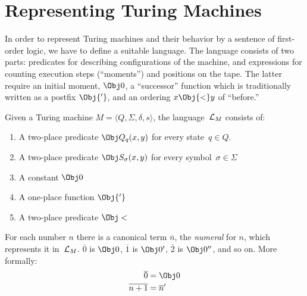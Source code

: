 \documentclass[open-logic-section]{subfiles}
\begin{document}
\section{Representing Turing Machines}

\begin{wordy}
In order to represent Turing machines and their behavior by a sentence
of first-order logic, we have to define a suitable language. The
language consists of two parts: predicates for describing
configurations of the machine, and expressions for counting execution
steps (``moments'') and positions on the tape. The latter require an
initial moment, $\Obj 0$, a ``successor'' function which is
traditionally written as a postfix $\Obj{'}$, and an ordering $x
\Obj{<} y$ of ``before.''
\end{wordy}

\begin{defn}
Given a Turing machine $M = \langle Q, \Sigma, \delta, s\rangle$, the
language~$\mathcal L_M$ consists of:
\begin{enumerate}
\item A two-place predicate $\Obj Q_q(x, y)$ for every state~$q \in Q$.
\item A two-place predicate $\Obj S_\sigma(x, y)$ for every
  symbol~$\sigma\in \Sigma$
\item A constant $\Obj 0$
\item A one-place function $\Obj{'}$
\item A two-place predicate $\Obj <$
\end{enumerate}
\end{defn}

For each number $n$ there is a canonical term $\overline n$, the
\emph{numeral} for $n$, which represents it in~$\mathcal L_M$. $\overline
0$ is $\Obj 0$, $\overline 1$ is $\Obj 0'$, $\overline 2$ is $\Obj
0''$, and so on. More formally:
\begin{align*}
\overline 0 & = \Obj 0 \\
\overline{n+1} &= \overline{n}'
\end{align*}
\end{document}
